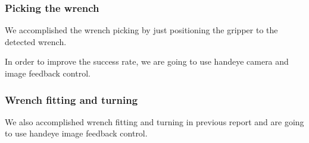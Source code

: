 \subsubsection{Picking the wrench}
We accomplished the wrench picking by just positioning the gripper to the detected wrench.

In order to improve the success rate, we are going to use handeye camera and image feedback control.


\subsubsection{Wrench fitting and turning}
We also accomplished wrench fitting and turning in previous report and are going to use handeye image feedback control.
